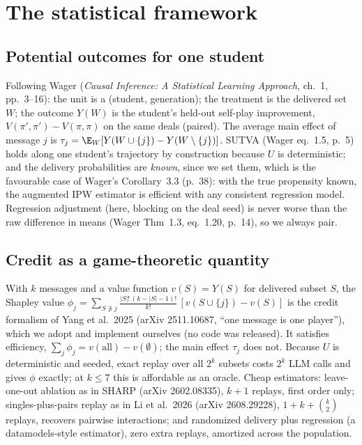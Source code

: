 \documentclass[11pt]{article}
\begin{document}
\section{The statistical framework}\label{sec:framework}

\subsection{Potential outcomes for one student}

Following Wager (\emph{Causal Inference: A Statistical Learning Approach}, ch.~1, pp.~3--16): the unit is a
(student, generation); the treatment is the delivered set $W$; the outcome $Y(W)$ is the student's held-out
self-play improvement, $V(\pi',\pi')-V(\pi,\pi)$ on the same deals (paired). The average main effect of message $j$
is $\tau_j=\E_W[Y(W\cup\{j\})-Y(W\setminus\{j\})]$. SUTVA (Wager eq.~1.5, p.~5) holds along one student's
trajectory by construction because $U$ is deterministic; and the delivery probabilities are \emph{known}, since we
set them, which is the favourable case of Wager's Corollary~3.3 (p.~38): with the true propensity known, the
augmented IPW estimator is efficient with any consistent regression model. Regression adjustment (here, blocking on
the deal seed) is never worse than the raw difference in means (Wager Thm~1.3, eq.~1.20, p.~14), so we always pair.

\subsection{Credit as a game-theoretic quantity}

With $k$ messages and a value function $v(S)=Y(S)$ for delivered subset $S$, the Shapley value
$\phi_j=\sum_{S\not\ni j}\frac{|S|!\,(k-|S|-1)!}{k!}\,[v(S\cup\{j\})-v(S)]$ is the credit formalism of Yang et
al.\ 2025 (arXiv 2511.10687, ``one message is one player''), which we adopt and implement ourselves (no code was
released). It satisfies efficiency, $\sum_j\phi_j=v(\text{all})-v(\emptyset)$; the main effect $\tau_j$ does not.
Because $U$ is deterministic and seeded, exact replay over all $2^k$ subsets costs $2^k$ LLM calls and gives
$\phi$ exactly; at $k\le 7$ this is affordable as an oracle. Cheap estimators: leave-one-out ablation as in SHARP
(arXiv 2602.08335), $k+1$ replays, first order only; singles-plus-pairs replay as in Li et al.\ 2026 (arXiv
2608.29228), $1+k+\binom{k}{2}$ replays, recovers pairwise interactions; and randomized delivery plus regression
(a datamodels-style estimator), zero extra replays, amortized across the population.
\end{document}
